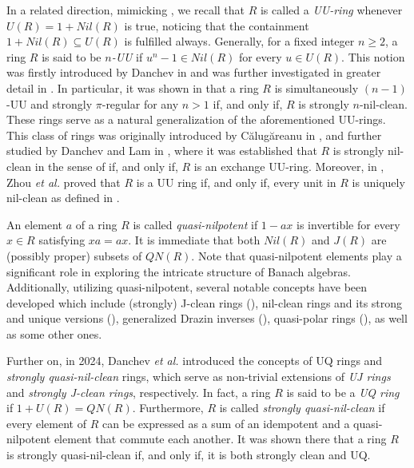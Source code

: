 \documentclass[12pt]{amsart}
\theoremstyle{definition}
\begin{document}
In a related direction, mimicking \cite{DL}, we recall that $R$ is called a {\it UU-ring} whenever $U(R)=1+Nil(R)$ is true, noticing that the containment $1+Nil(R)\subseteq U(R)$ is fulfilled always. Generally, for a fixed integer $n \ge 2$, a ring $R$ is said to be {\it $n$-UU} if $u^n - 1 \in Nil(R)$ for every $u \in U(R)$. This notion was firstly introduced by Danchev in \cite{4} and was further investigated in greater detail in \cite{dam}. In particular, it was shown in \cite{dam} that a ring $R$ is simultaneously $(n-1)$-UU and strongly $\pi$-regular for any $n>1$ if, and only if, $R$ is strongly $n$-nil-clean. These rings serve as a natural generalization of the aforementioned UU-rings. This class of rings was originally introduced by C\u{a}lug\u{a}reanu in \cite{CUU}, and further studied by Danchev and Lam in \cite{DL}, where it was established that $R$ is strongly nil-clean in the sense of \cite{diesl2013} if, and only if, $R$ is an exchange UU-ring. Moreover, in \cite{karimi}, Zhou {\it et al.} proved that $R$ is a UU ring if, and only if, every unit in $R$ is uniquely nil-clean as defined in \cite{diesl2013}.

An element $a$ of a ring $R$ is called {\it quasi-nilpotent} if $1 - ax$ is invertible for every $x \in R$ satisfying $xa = ax$. It is immediate that both $Nil(R)$ and $J(R)$ are (possibly proper) subsets of $QN(R)$. Note that quasi-nilpotent elements play a significant role in exploring the intricate structure of Banach algebras. Additionally, utilizing quasi-nilpotent, several notable concepts have been developed which include (strongly) J-clean rings (\cite{chen2010}), nil-clean rings and its strong and unique versions (\cite{diesl2013}), generalized Drazin inverses (\cite{koliha1996}), quasi-polar rings (\cite{chen2012}), as well as some other ones.

Further on, in 2024, Danchev {\it et al.} introduced \cite{daoa} the concepts of UQ rings and {\it strongly quasi-nil-clean} rings, which serve as non-trivial extensions of {\it UJ rings} and {\it strongly J-clean rings}, respectively. In fact, a ring $R$ is said to be a {\it UQ ring} if $1 + U(R) = QN(R)$. Furthermore, $R$ is called {\it strongly quasi-nil-clean} if every element of $R$ can be expressed as a sum of an idempotent and a quasi-nilpotent element that commute each another. It was shown there that a ring $R$ is strongly quasi-nil-clean if, and only if, it is both strongly clean and UQ.
\end{document}

